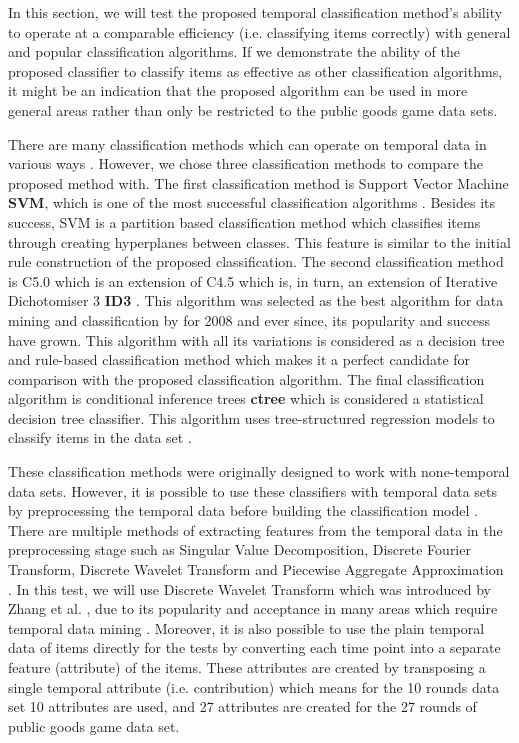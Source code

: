 In this section, we will test the proposed temporal classification method's ability to operate at a comparable efficiency (i.e. classifying items correctly) with general and popular classification algorithms. If we demonstrate the ability of the proposed classifier to classify items as effective as other classification algorithms, it might be an indication that the proposed algorithm can be used in more general areas rather than only be restricted to the public goods game data sets.

There are many classification methods which can operate on temporal data in various ways \cite{Amr2009}. However, we chose three classification methods to compare the proposed method with. The first classification method is Support Vector Machine \textbf{SVM}, which is one of the most successful classification algorithms  \cite{Bazi2006}. Besides its success, SVM is a partition based classification method which classifies items through creating hyperplanes between classes. This feature is similar to the initial rule construction of the proposed classification. The second classification method is C5.0 which is an extension of C4.5 which is, in turn, an extension of Iterative Dichotomiser 3 \textbf{ID3} \cite{Letham2010}. This algorithm was selected as the best algorithm for data mining and classification by \cite{Wu2008} for 2008 and ever since, its popularity and success have grown. This algorithm with all its variations is considered as a decision tree and rule-based classification method \cite{Giacometti2008} which makes it a perfect candidate for comparison with the proposed classification algorithm. The final classification algorithm is conditional inference trees \textbf{ctree} which is considered a statistical decision tree classifier. This algorithm uses tree-structured regression models to classify items in the data set \cite{Hothorn2006a}.

These classification methods were originally designed to work with none-temporal data sets. However, it is possible to use these classifiers with temporal data sets by preprocessing the temporal data before building the classification model \cite{Revesz2011}. There are multiple methods of extracting features from the temporal data in the preprocessing stage such as Singular Value Decomposition, Discrete Fourier Transform, Discrete Wavelet Transform and Piecewise Aggregate Approximation \cite{Zhao2014}. In this test, we will use Discrete Wavelet Transform which was introduced by Zhang et al. \cite{Zhang2004}, due to its popularity and acceptance in many areas which require temporal data mining \cite{Fu2011}. Moreover, it is also possible to use the plain temporal data of items directly for the tests by converting each time point into a separate feature (attribute) of the items. These attributes are created by transposing a single temporal attribute (i.e. contribution) which means for the 10 rounds data set 10 attributes are used, and 27 attributes are created for the 27 rounds of public goods game data set.

